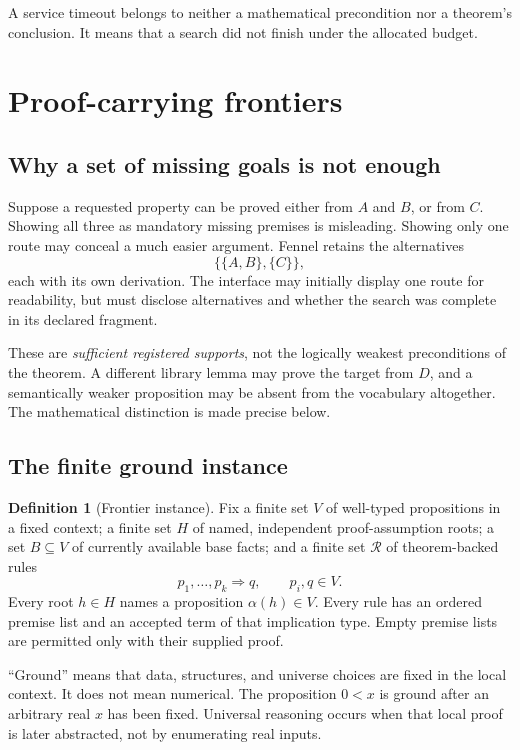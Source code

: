 \documentclass[11pt,a4paper]{article}
\theoremstyle{definition}
\newtheorem{definition}[theorem]{Definition}
\theoremstyle{remark}
\begin{document}
A service timeout belongs to neither a mathematical precondition nor a theorem's
conclusion. It means that a search did not finish under the allocated budget.

\section{Proof-carrying frontiers}
\label{sec:frontiers}

\subsection{Why a set of missing goals is not enough}
Suppose a requested property can be proved either from $A$ and $B$, or from $C$.
Showing all three as mandatory missing premises is misleading. Showing only
one route may conceal a much easier argument. Fennel retains the alternatives
\[
 \{\{A,B\},\{C\}\},
\]
each with its own derivation. The interface may initially display one route
for readability, but must disclose alternatives and whether the search was
complete in its declared fragment.

These are \emph{sufficient registered supports}, not the logically weakest
preconditions of the theorem. A different library lemma may prove the target
from $D$, and a semantically weaker proposition may be absent from the
vocabulary altogether. The mathematical distinction is made precise below.

\subsection{The finite ground instance}
\begin{definition}[Frontier instance]
Fix a finite set $V$ of well-typed propositions in a fixed context; a finite
set $H$ of named, independent proof-assumption roots; a set $B\subseteq V$ of
currently available base facts; and a finite set $\mathcal R$ of theorem-backed
rules
\[
 p_1,\ldots,p_k\Longrightarrow q,\qquad p_i,q\in V.
\]
Every root $h\in H$ names a proposition $\alpha(h)\in V$. Every rule has an
ordered premise list and an accepted term of that implication type. Empty
premise lists are permitted only with their supplied proof.
\end{definition}

``Ground'' means that data, structures, and universe choices are fixed in the
local context. It does not mean numerical. The proposition $0<x$ is ground
after an arbitrary real $x$ has been fixed. Universal reasoning occurs when
that local proof is later abstracted, not by enumerating real inputs.
\end{document}

